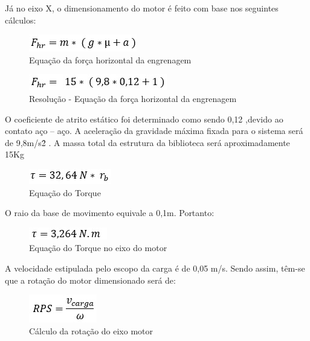 Já no eixo X, o dimensionamento do motor é feito com base nos seguintes cálculos:

\begin{figure}[!h]
\centering
\includegraphics[scale=0.8, angle = 360]{figuras/formula1}
\caption[]{Equação da força horizontal da engrenagem}
\end{figure}
\FloatBarrier

\begin{figure}[!h]
\centering
\includegraphics[scale=0.8, angle = 360]{figuras/formula2}
\caption[]{Resolução - Equação da força horizontal da engrenagem}
\end{figure}
\FloatBarrier

O coeficiente de atrito estático foi determinado como sendo 0,12 ,devido ao contato aço – aço. A aceleração da gravidade máxima fixada para o sistema será de 9,8m/s\^2 . A massa total da estrutura da biblioteca será aproximadamente 15Kg

\begin{figure}[!h]
\centering
\includegraphics[scale=0.8, angle = 360]{figuras/formula3}
\caption[]{Equação do Torque}
\end{figure}
\FloatBarrier

O raio da base de movimento equivale a 0,1m. Portanto:

\begin{figure}[!h]
\centering
\includegraphics[scale=0.8, angle = 360]{figuras/formula4}
\caption[]{Equação do Torque no eixo do motor}
\end{figure}
\FloatBarrier

A velocidade estipulada pelo escopo da carga é de 0,05 m/s. Sendo assim, têm-se que a rotação do motor dimensionado será de:
 
\begin{figure}[!h]
\centering
\includegraphics[scale=0.8, angle = 360]{figuras/formula5}
\caption[]{Cálculo da rotação do eixo motor}
\end{figure}
\FloatBarrier

